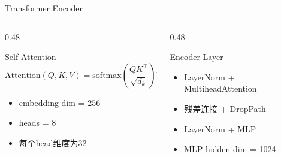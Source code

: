 \documentclass[aspectratio=169,10pt]{ctexbeamer}
\begin{document}
\begin{frame}{Transformer Encoder}
	\begin{columns}[T,onlytextwidth]
		\begin{column}{0.48\textwidth}
			\begin{block}{Self-Attention}
				\[
					\mathrm{Attention}(Q,K,V)
					=\mathrm{softmax}\left(\frac{QK^\top}{\sqrt{d_k}}\right)V
				\]
			\end{block}
			\begin{itemize}
				\item embedding dim = 256
				\item heads = 8
				\item 每个head维度为32
			\end{itemize}
		\end{column}
		\begin{column}{0.48\textwidth}
			\begin{block}{Encoder Layer}
				\begin{itemize}
					\item LayerNorm + MultiheadAttention
					\item 残差连接 + DropPath
					\item LayerNorm + MLP
					\item MLP hidden dim = 1024
				\end{itemize}
			\end{block}
		\end{column}
	\end{columns}
\end{frame}
\end{document}
